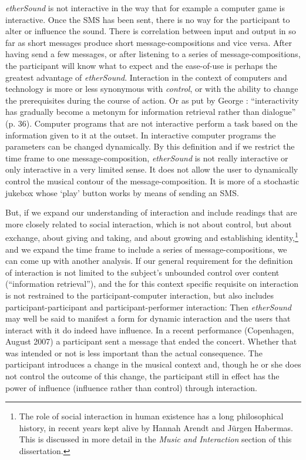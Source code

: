 \emph{etherSound} is not interactive in the way that for example a computer game is interactive. Once the SMS has been sent, there is no way for the participant to alter or influence the sound. There is correlation between input and output in so far as short messages produce short message-compositions and vice versa. After having send a few messages, or after listening to a series of message-compositions, the participant will know what to expect and the ease-of-use is perhaps the greatest advantage of \emph{etherSound}. Interaction in the context of computers and technology is more or less synonymous with \textit{control}, or with the ability to change the prerequisites during the course of action. Or as put by George \citet{lewis00}: ``interactivity has gradually become a metonym for information retrieval rather than dialogue'' (p. 36). 
Computer programs that are not interactive perform a task based on the information given to it at the outset. In interactive computer programs the parameters can be changed dynamically. By this definition and if we restrict the time frame to one message-composition, \emph{etherSound} is not really interactive or only interactive in a very limited sense. It does not allow the user to dynamically control the musical contour of the message-composition. It is more of a stochastic jukebox whose `play' button works by means of sending an SMS. 

But, if we expand our understanding of interaction and include readings that are more closely related to social interaction, which is not about control, but about exchange, about giving and taking, and about growing and establishing identity,\footnote{The role of social   interaction in human existence has a long philosophical history, in   recent years kept alive by Hannah Arendt and J\"{u}rgen Habermas.   This is discussed in more detail in the \emph{Music and Interaction}   section of this dissertation.} and we expand the time frame to include a series of message-compositions, we can come up with another analysis. If our general requirement for the definition of interaction is not limited to the subject's unbounded control over content (``information retrieval''), and the for this context specific requisite on interaction is not restrained to the participant-computer interaction, but also includes participant-participant and participant-performer interaction: Then \emph{etherSound} may well be said to manifest a form for dynamic interaction and the users that interact with it do indeed have influence.
In a recent performance (Copenhagen, August 2007) a participant sent a message that ended the concert.  Whether that was intended or not is less important than the actual consequence. The participant introduces a change in the musical context and, though he or she does not control the outcome of this change, the participant still in effect has the power of influence (influence rather than control) through interaction. 

